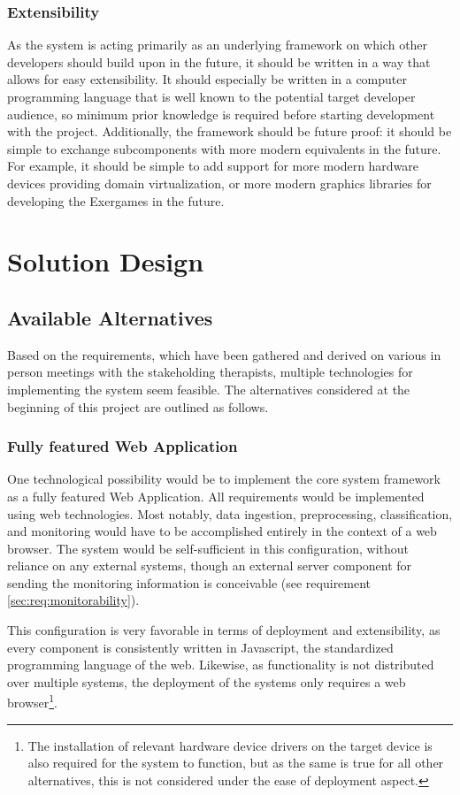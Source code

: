 \subsubsection{Extensibility}
As the system is acting primarily as an underlying framework on which other developers should build upon in the future, it should be written in a way that allows for easy extensibility. It should especially be written in a computer programming language that is well known to the potential target developer audience, so minimum prior knowledge is required before starting development with the project. Additionally, the framework should be future proof: it should be simple to exchange subcomponents with more modern equivalents in the future. For example, it should be simple to add support for more modern hardware devices providing domain virtualization, or more modern graphics libraries for developing the Exergames in the future.

\section{Solution Design}
\subsection{Available Alternatives}
Based on the requirements, which have been gathered and derived on various in person meetings with the stakeholding therapists, multiple technologies for implementing the system seem feasible. The alternatives considered at the beginning of this project are outlined as follows.

\subsubsection{Fully featured Web Application}
\label{sec:alt:fully-featured-web-app}
One technological possibility would be to implement the core system framework as a fully featured Web Application. All requirements would be implemented using web technologies. Most notably, data ingestion, preprocessing, classification, and monitoring would have to be accomplished entirely in the context of a web browser. The system would be self-sufficient in this configuration, without reliance on any external systems, though an external server component for sending the monitoring information is conceivable (see requirement \ref{sec:req:monitorability}).

This configuration is very favorable in terms of deployment and extensibility, as every component is consistently written in Javascript, the standardized programming language of the web. Likewise, as functionality is not distributed over multiple systems, the deployment of the systems only requires a web browser\footnote{The installation of relevant hardware device drivers on the target device is also required for the system to function, but as the same is true for all other alternatives, this is not considered under the ease of deployment aspect.}.

